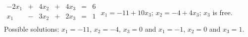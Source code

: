 {$\begin{array}{KQJQJQQ}
-2x_1&+&4x_2&+&4x_3&=&6\\
x_1&-&3x_2&+&2x_3&=&1\\
\end{array}$}
{$x_1=-11+10x_3$; $x_2=-4+4x_3$; $x_3$ is free. Possible solutions: $x_1=-11$, $x_2 = -4$, $x_3=0$ and $x_1 = -1$, $x_2 = 0$ and $x_3 = 1$.}
